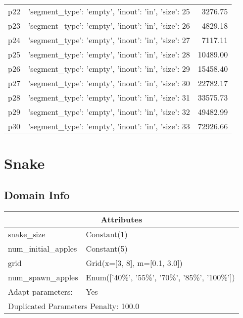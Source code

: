 \documentclass{article}
\begin{document}
\begin{center}
\begin{tabular}{@{}l|r|r@{}}
  p22&{'segment\_type': 'empty', 'inout': 'in', 'size': 25}&3276.75\\
  p23&{'segment\_type': 'empty', 'inout': 'in', 'size': 26}&4829.18\\
  p24&{'segment\_type': 'empty', 'inout': 'in', 'size': 27}&7117.11\\
  p25&{'segment\_type': 'empty', 'inout': 'in', 'size': 28}&10489.00\\
  p26&{'segment\_type': 'empty', 'inout': 'in', 'size': 29}&15458.40\\
  p27&{'segment\_type': 'empty', 'inout': 'in', 'size': 30}&22782.17\\
  p28&{'segment\_type': 'empty', 'inout': 'in', 'size': 31}&33575.73\\
  p29&{'segment\_type': 'empty', 'inout': 'in', 'size': 32}&49482.99\\
  p30&{'segment\_type': 'empty', 'inout': 'in', 'size': 33}&72926.66
                            \end{tabular}
                            \end{center}
                    
                            \newpage \section{Snake}
                    \subsection*{Domain Info}

                    \begin{center}
                    \begin{tabular}{@{}p{}p{}@{}}
                    \multicolumn{2}{c}{\bf \large Attributes}\\\midrule
                    snake\_size & Constant(1)\\
num\_initial\_apples & Constant(5)\\
grid & Grid(x=[3, 8], m=[0.1, 3.0])\\
num\_spawn\_apples & Enum(['40\%', '55\%', '70\%', '85\%', '100\%'])
                    
                    \\\midrule
                    Adapt parameters: & Yes
                
                     \\\midrule
                    \multicolumn{2}{l}{Duplicated Parameters Penalty: 100.0}
                    \end{tabular}
                    \end{center}
                
\end{document}

